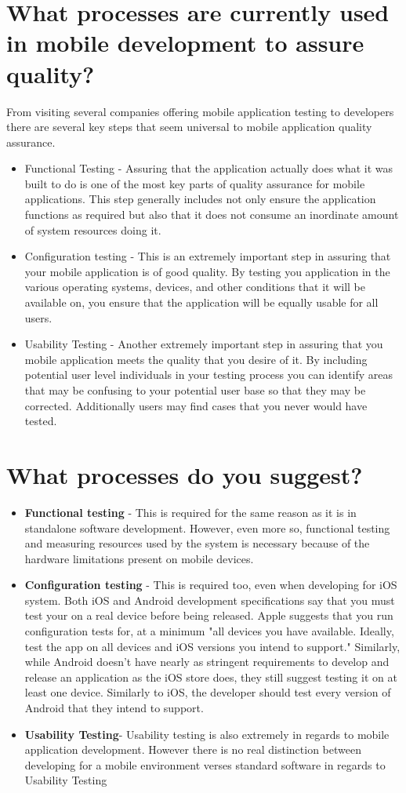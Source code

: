\documentclass{article}
\begin{document}
	\section*{What processes are currently used in mobile development to assure quality?}
		From visiting several companies offering mobile application testing to developers there are several key steps that seem universal to mobile application quality assurance.
		\begin{itemize}
			\item Functional Testing - Assuring that the application actually does what it was built to do is one of the most key parts of quality assurance for mobile applications. This step generally includes not only ensure the application functions as required but also that it does not consume an inordinate amount of system resources doing it.
			\item Configuration testing - This is an extremely important step in assuring that your mobile application is of good quality. By testing you application in the various operating systems, devices, and other conditions that it will be available on, you ensure that the application will be equally usable for all users.
			\item Usability Testing - Another extremely important step in assuring that you mobile application meets the quality that you desire of it. By including potential user level individuals in your testing process you can identify areas that may be confusing to your potential user base so that they may be corrected. Additionally users may find cases that you never would have tested. 
		\end{itemize}
	\section*{What processes do you suggest?}
		\begin{itemize}
			\item \textbf{Functional testing} - This is required for the same reason as it is in standalone software development. However, even more so, functional testing and measuring resources used by the system is necessary because of the hardware limitations present on mobile devices.
			\item \textbf{Configuration testing} - This is required too, even when developing for iOS system. Both iOS and Android development specifications say that you must test your on a real device before being released. Apple suggests that you run configuration tests for, at a minimum "all devices you have available. Ideally, test the app on all devices and iOS versions you intend to support." Similarly, while Android doesn't have nearly as stringent requirements to develop and release an application as the iOS store does, they still suggest testing it on at least one device. Similarly to iOS, the developer should test every version of Android that they intend to support.
			\item \textbf{Usability Testing}- Usability testing is also extremely in regards to mobile application development. However there is no real distinction between developing for a mobile environment verses standard software in regards to Usability Testing 
		\end{itemize}
\end{document}
